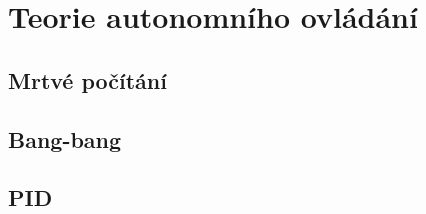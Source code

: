 \documentclass[../main.tex]{subfiles}
\begin{document}
	\section{Teorie autonomního ovládání}

	\subsection{Mrtvé počítání}

	\subsection{Bang-bang}

	\subsection{PID}
\end{document}

